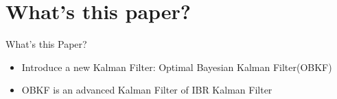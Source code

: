 \section{What's this paper?}
\begin{frame}
    \tableofcontents[currentsection]
\end{frame}

\begin{frame}{What's this Paper?}
\begin{itemize}
    \item Introduce a new Kalman Filter: Optimal Bayesian Kalman Filter(OBKF)\cite{Dehghannasiri2018}
    \item OBKF is an advanced Kalman Filter of IBR Kalman Filter\cite{Dehghannasiri2017}
\end{itemize}
\end{frame}